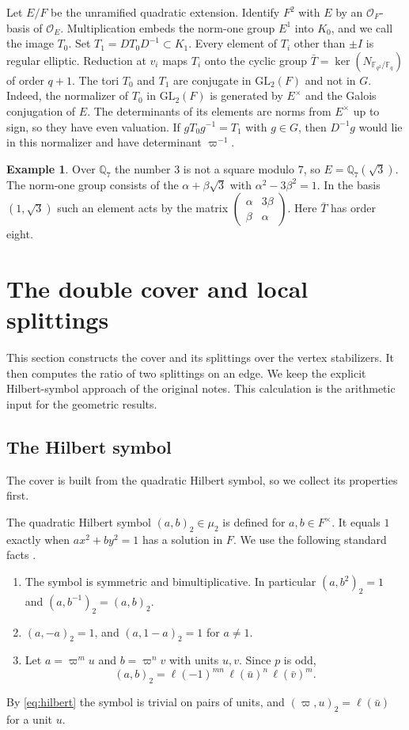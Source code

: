\documentclass[12pt,letterpaper]{article}
\numberwithin{equation}{section}
\theoremstyle{definition}
\newtheorem{example}[theorem]{Example}
\theoremstyle{remark}
\newcommand{\OO}{\mathcal O_F}
\newcommand{\OEr}{\mathcal O_E}
\newcommand{\kk}{\mathbb F_q}
\newcommand{\sm}[4]{\left(\begin{smallmatrix}#1&#2\\#3&#4\end{smallmatrix}\right)}
\begin{document}
Let $E/F$ be the unramified quadratic extension. Identify $F^2$ with $E$ by an $\OO$-basis of $\OEr$. Multiplication embeds the norm-one group $E^1$ into $K_0$, and we call the image $T_0$. Set $T_1=DT_0D^{-1}\subset K_1$. Every element of $T_i$ other than $\pm I$ is regular elliptic. Reduction at $v_i$ maps $T_i$ onto the cyclic group $\bar T=\ker(N_{\mathbb F_{q^2}/\kk})$ of order $q+1$. The tori $T_0$ and $T_1$ are conjugate in $\mathrm{GL}_2(F)$ and not in $G$. Indeed, the normalizer of $T_0$ in $\mathrm{GL}_2(F)$ is generated by $E^\times$ and the Galois conjugation of $E$. The determinants of its elements are norms from $E^\times$ up to sign, so they have even valuation. If $gT_0g^{-1}=T_1$ with $g\in G$, then $D^{-1}g$ would lie in this normalizer and have determinant $\varpi^{-1}$.

\begin{example}\label{ex:torus}
Over $\mathbb Q_7$ the number $3$ is not a square modulo $7$, so $E=\mathbb Q_7(\sqrt3)$. The norm-one group consists of the $\alpha+\beta\sqrt3$ with $\alpha^2-3\beta^2=1$. In the basis $(1,\sqrt3)$ such an element acts by the matrix $\sm{\alpha}{3\beta}{\beta}{\alpha}$. Here $\bar T$ has order eight.
\end{example}

\section{The double cover and local splittings}\label{sec:cover}
This section constructs the cover and its splittings over the vertex stabilizers. It then computes the ratio of two splittings on an edge. We keep the explicit Hilbert-symbol approach of the original notes. This calculation is the arithmetic input for the geometric results.

\subsection{The Hilbert symbol}
The cover is built from the quadratic Hilbert symbol, so we collect its properties first.

The quadratic Hilbert symbol $(a,b)_2\in\mu_2$ is defined for $a,b\in F^\times$. It equals $1$ exactly when $ax^2+by^2=1$ has a solution in $F$. We use the following standard facts \cite{Ne86}.
\begin{enumerate}[label=(H\arabic*),leftmargin=3em]
\item The symbol is symmetric and bimultiplicative. In particular $(a,b^2)_2=1$ and $(a,b^{-1})_2=(a,b)_2$.
\item $(a,-a)_2=1$, and $(a,1-a)_2=1$ for $a\ne1$.
\item Let $a=\varpi^mu$ and $b=\varpi^nv$ with units $u,v$. Since $p$ is odd,
\begin{equation}\label{eq:hilbert}
 (a,b)_2=\ell(-1)^{mn}\,\ell(\bar u)^n\,\ell(\bar v)^m .
\end{equation}
\end{enumerate}
By \eqref{eq:hilbert} the symbol is trivial on pairs of units, and $(\varpi,u)_2=\ell(\bar u)$ for a unit $u$.
\end{document}
